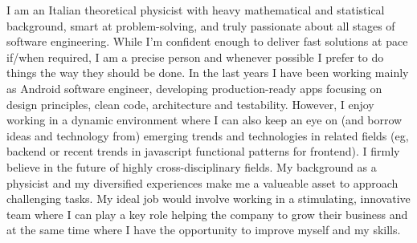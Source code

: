 
\begin{cvparagraph}
I am an Italian theoretical physicist with heavy mathematical and statistical 
background, smart at problem-solving, and truly passionate about all stages of software engineering. 
While 
I'm confident enough to
deliver 
fast solutions at pace
if/when
required, 
I am a precise person and whenever possible I prefer to do things the way they
should be done.
In the last years I have been working mainly as Android software engineer,  developing production-ready apps 
	focusing on design principles, clean code, architecture and testability.
 However, I enjoy  working in a dynamic
environment 
 where I can also keep an eye on (and borrow ideas and technology from) emerging trends and technologies in related
fields (eg, backend or recent trends in javascript functional patterns for frontend). 
 I firmly
believe in the future of highly cross-disciplinary fields.
My background as a physicist and my diversified experiences make me a valueable asset to approach challenging tasks. 
My ideal job would involve working in a stimulating, innovative team where I
can play a key role helping the company to grow their business and at the same time
where I have the opportunity to improve myself and my skills.
\end{cvparagraph}
